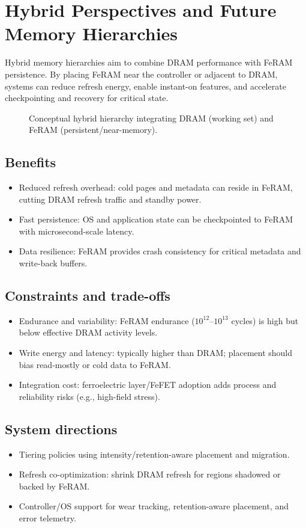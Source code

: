 \section{Hybrid Perspectives and Future Memory Hierarchies}

Hybrid memory hierarchies aim to combine DRAM performance with FeRAM persistence. By placing FeRAM near the controller or adjacent to DRAM, systems can reduce refresh energy, enable instant-on features, and accelerate checkpointing and recovery for critical state.

\begin{figure}[!t]
  \centering
  \fbox{\rule{0pt}{50mm}\rule{0.95\linewidth}{0pt}}
  \caption{Conceptual hybrid hierarchy integrating DRAM (working set) and FeRAM (persistent/near-memory).}
  \label{fig:hybrid_hierarchy}
\end{figure}

\subsection*{Benefits}
\begin{itemize}
  \item Reduced refresh overhead: cold pages and metadata can reside in FeRAM, cutting DRAM refresh traffic and standby power.
  \item Fast persistence: OS and application state can be checkpointed to FeRAM with microsecond-scale latency.
  \item Data resilience: FeRAM provides crash consistency for critical metadata and write-back buffers.
\end{itemize}

\subsection*{Constraints and trade-offs}
\begin{itemize}
  \item Endurance and variability: FeRAM endurance ($10^{12}$--$10^{13}$ cycles) is high but below effective DRAM activity levels.
  \item Write energy and latency: typically higher than DRAM; placement should bias read-mostly or cold data to FeRAM.
  \item Integration cost: ferroelectric layer/FeFET adoption adds process and reliability risks (e.g., high-field stress).
\end{itemize}

\subsection*{System directions}
\begin{itemize}
  \item Tiering policies using intensity/retention-aware placement and migration.
  \item Refresh co-optimization: shrink DRAM refresh for regions shadowed or backed by FeRAM.
  \item Controller/OS support for wear tracking, retention-aware placement, and error telemetry.
\end{itemize}
